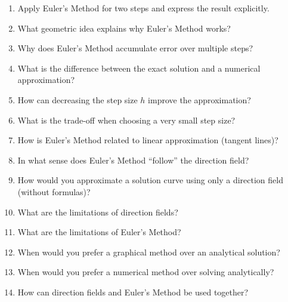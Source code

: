 \begin{enumerate}
\item Apply Euler’s Method for two steps and express the result explicitly.

\item What geometric idea explains why Euler’s Method works?

\item Why does Euler’s Method accumulate error over multiple steps?

\item What is the difference between the exact solution and a numerical approximation?

\item How can decreasing the step size $h$ improve the approximation?

\item What is the trade-off when choosing a very small step size?

\item How is Euler’s Method related to linear approximation (tangent lines)?

\item In what sense does Euler’s Method “follow” the direction field?

\item How would you approximate a solution curve using only a direction field (without formulas)?

\item What are the limitations of direction fields?

\item What are the limitations of Euler’s Method?

\item When would you prefer a graphical method over an analytical solution?

\item When would you prefer a numerical method over solving analytically?

\item How can direction fields and Euler’s Method be used together?

\end{enumerate}

